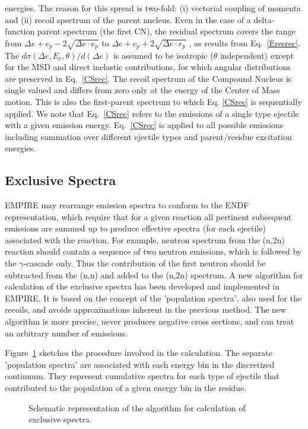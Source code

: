 \documentclass[twocolumn,amsmath,amssymb,10pt,groupedaddress,letter]{revtex4}
\begin{document}
energies. The reason for this spread is two-fold: (i) vectorial coupling
of momenta and (ii) recoil spectrum of the parent nucleus. Even in
the case of a delta-function parent spectrum (the first CN), the residual
spectrum covers the range from $\Delta e+e_{p}-2\sqrt{\Delta e\cdot e_{p}}$
to $\Delta e+e_{p}+2\sqrt{\Delta e\cdot e_{p}}$ , as results from
Eq.~\ref{Eresrec}. The $d\sigma(\Delta e,E_{r},\theta)/d(\Delta e)$
is assumed to be isotropic ($\theta$ independent) except for the
MSD and direct inelastic contributions, for which angular
distributions are preserved in Eq.~\ref{CSrec}. The recoil spectrum
of the Compound Nucleus is single valued and differs from zero only
at the energy of the Center of Mass motion. This is also the first-parent
spectrum to which Eq. \ref{CSrec} is sequentially applied. We note
that Eq.~\ref{CSrec} refers to the emissions of a single type ejectile
with a given emission energy. Eq.~\ref{CSrec} is  applied to all
possible emissions including summation over different ejectile types
and parent/residue excitation energies.

\subsection{Exclusive Spectra}
EMPIRE may rearrange emission spectra to conform to the ENDF representation,
which require that for a given reaction all pertinent subsequent emissions
are summed up to produce effective spectra (for each ejectile) associated
with the reaction. For example, neutron spectrum from the (n,2n) reaction
should contain a sequence of two neutron emissions, which is followed
by the $\gamma$-cascade only. Thus the contribution of the first
neutron should be subtracted from the (n,n) and added to the (n,2n)
spectrum.
A new algorithm for calculation of the exclusive spectra has been
developed and implemented in EMPIRE. It is based on the concept
of the 'population spectra', also used for the recoils, and avoids
approximations inherent in the previous method. The new algorithm
is more precise, never produces negative cross sections, and can treat
an arbitrary number of emissions.

Figure~\ref{exclusive} sketches the procedure involved in the calculation.
The separate 'population spectra' are associated with each energy bin in the
discretized continuum. They represent cumulative spectra for each type of ejectile
that contributed to the population of a given energy bin in the residue.
\begin{figure}[htbp]
\caption{\label{exclusive} Schematic representation  of the algorithm for calculation
of exclusive spectra.}
\end{figure}
\end{document}
